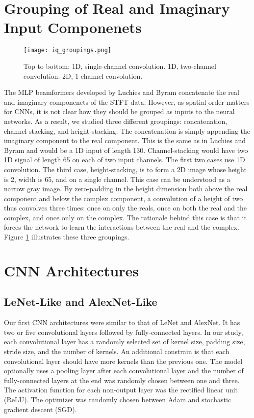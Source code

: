 


\section{Grouping of Real and Imaginary Input Componenets}
\begin{figure}
  \centerline{\texttt{[image: iq\_groupings.png]}}
  \caption{Top to bottom: 1D, single-channel convolution. 1D, two-channel convolution. 2D, 1-channel convolution.}
  \label{fig:iq_groupings}
\end{figure}


The MLP beamformers developed by Luchies and Byram concatenate the real and imaginary componenets of the STFT data. However, as spatial order matters for CNNs, it is not clear how they should be grouped as inputs to the neural networks. As a result, we studied three different groupings: concatenation, channel-stacking, and height-stacking. The concatenation is simply appending the imaginary component to the real component. This is the same as in Luchies and Byram and would be a 1D input of length 130. Channel-stacking would have two 1D signal of length 65 on each of two input channels. The first two cases use 1D convolution. The third case, height-stacking, is to form a 2D image whose height is 2, width is 65, and on a single channel. This case can be understood as a narrow gray image. By zero-padding in the height dimension both above the real component and below the complex component, a convolution of a height of two thus convolves three times: once on only the reals, once on both the real and the complex, and once only on the complex. The rationale behind this case is that it forces the network to learn the interactions between the real and the complex. Figure \ref{fig:iq_groupings} illustrates these three groupings.

\section{CNN Architectures}
  \subsection{LeNet-Like and AlexNet-Like}
  Our first CNN architectures were similar to that of LeNet and AlexNet. It has two or five convolutional layers followed by fully-connected layers. In our study, each convolutional layer has a randomly selected set of kernel size, padding size, stride size, and the number of kernels. An additional constrain is that each convolutional layer should have more kernels than the previous one. The model optionally uses a pooling layer after each convolutional layer and the number of fully-connected layers at the end was randomly chosen between one and three. The activation function for each non-output layer was the rectified linear unit (ReLU). The optimizer was randomly chosen between Adam and stochastic gradient descent (SGD).


